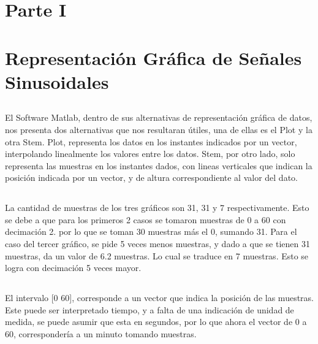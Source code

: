 \documentclass[11pt, letterpaper, titlepage]{article}
\begin{document}
\maketitle 
\newpage
\section*{Parte I}
\section{Representación Gráfica de Señales Sinusoidales}


\subsection{} 
El Software Matlab, dentro de sus alternativas de representación gráfica de datos, nos presenta dos alternativas que nos resultaran útiles, una de ellas es el Plot y la otra Stem. Plot, representa los datos en los instantes indicados por un vector, interpolando linealmente los valores entre los datos. Stem, por otro lado, solo representa las muestras en los instantes dados, con lineas verticales que indican la posición indicada por un vector, y de altura correspondiente al valor del dato.
\subsection{}
La cantidad de muestras de los tres gráficos son 31, 31 y 7 respectivamente. Esto se debe a que para los primeros 2 casos se tomaron muestras de 0 a 60 con decimación 2. por lo que se toman 30 muestras más el 0, sumando 31. Para el caso del tercer gráfico, se pide 5 veces menos muestras, y dado a que se tienen 31 muestras, da un valor de 6.2 muestras. Lo cual se traduce en 7 muestras. Esto se logra con decimación 5 veces mayor.
\subsection{}
El intervalo [0 60], corresponde a un vector que indica la posición de las muestras. Este puede ser interpretado tiempo, y a falta de una indicación de unidad de medida, se puede asumir que esta en segundos, por lo que ahora el vector de 0 a 60, correspondería a un minuto tomando muestras.
\end{document}
